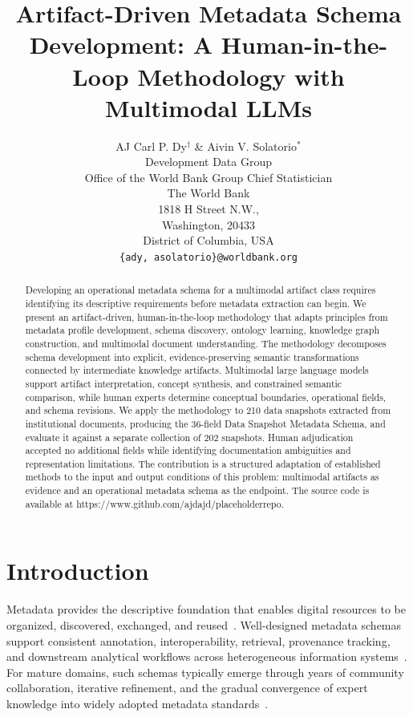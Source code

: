\documentclass{article}
\title{Artifact-Driven Metadata Schema Development: A Human-in-the-Loop Methodology with Multimodal LLMs}
\author{AJ Carl P. Dy$^{\dagger}$ \& Aivin V. Solatorio$^{*}$ \\
Development Data Group \\
Office of the World Bank Group Chief Statistician \\
The World Bank \\
1818 H Street N.W., \\
Washington, 20433 \\
District of Columbia, USA \\
\texttt{\{ady, asolatorio\}@worldbank.org} }
\begin{document}
\maketitle

\begingroup
\renewcommand\thefootnote{\fnsymbol{footnote}}
\endgroup

\begin{abstract}

Developing an operational metadata schema for a multimodal artifact class requires identifying its descriptive requirements before metadata extraction can begin. We present an artifact-driven, human-in-the-loop methodology that adapts principles from metadata profile development, schema discovery, ontology learning, knowledge graph construction, and multimodal document understanding. The methodology decomposes schema development into explicit, evidence-preserving semantic transformations connected by intermediate knowledge artifacts. Multimodal large language models support artifact interpretation, concept synthesis, and constrained semantic comparison, while human experts determine conceptual boundaries, operational fields, and schema revisions. We apply the methodology to 210 data snapshots extracted from institutional documents, producing the 36-field Data Snapshot Metadata Schema, and evaluate it against a separate collection of 202 snapshots. Human adjudication accepted no additional fields while identifying documentation ambiguities and representation limitations. The contribution is a structured adaptation of established methods to the input and output conditions of this problem: multimodal artifacts as evidence and an operational metadata schema as the endpoint. The source code is available at https://www.github.com/ajdajd/placeholderrepo.

\end{abstract}

\section{Introduction}

Metadata provides the descriptive foundation that enables digital resources to be organized, discovered, exchanged, and reused~\citep{gilliland2008}. Well-designed metadata schemas support consistent annotation, interoperability, retrieval, provenance tracking, and downstream analytical workflows across heterogeneous information systems~\citep{metadatainteroperability2006}. For mature domains, such schemas typically emerge through years of community collaboration, iterative refinement, and the gradual convergence of expert knowledge into widely adopted metadata standards~\citep{caplan2003}.
\end{document}
